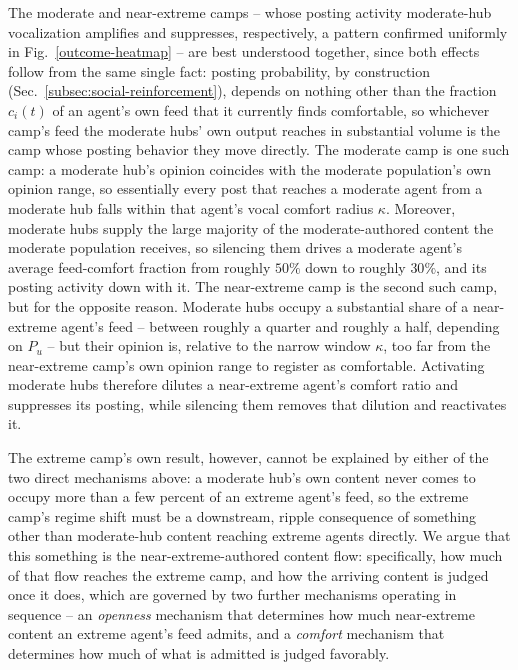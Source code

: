 \documentclass{svproc}
\def\VCR{\kappa}                 %
\begin{document}
The moderate and near-extreme camps -- whose posting activity
moderate-hub vocalization amplifies and suppresses, respectively, a
pattern confirmed uniformly in Fig.~\ref{outcome-heatmap} -- are
best understood together, since both effects follow from the same
single fact: posting probability, by construction
(Sec.~\ref{subsec:social-reinforcement}), depends on nothing other
than the fraction $c_i(t)$ of an agent's own feed that it currently
finds comfortable, so whichever camp's feed the moderate hubs' own
output reaches in substantial volume is the camp whose posting
behavior they move directly. The moderate camp is one such camp: a
moderate hub's opinion coincides with the moderate population's own
opinion range, so essentially every post that reaches a moderate
agent from a moderate hub falls within that agent's vocal comfort
radius $\VCR$. Moreover, moderate hubs supply the large majority of
the moderate-authored content the moderate population receives, so
silencing them drives a moderate agent's average feed-comfort
fraction from roughly $50\%$ down to roughly $30\%$, and its
posting activity down with it. The near-extreme camp is the second
such camp, but for the opposite reason. Moderate hubs occupy a
substantial share of a near-extreme agent's feed -- between roughly
a quarter and roughly a half, depending on $P_u$ -- but their
opinion is, relative to the narrow window $\VCR$, too far from the
near-extreme camp's own opinion range to register as comfortable.
Activating moderate hubs therefore dilutes a near-extreme agent's
comfort ratio and suppresses its posting, while silencing them
removes that dilution and reactivates it.

The extreme camp's own result, however, cannot be explained by
either of the two direct mechanisms above: a moderate hub's own
content never comes to occupy more than a few percent of an extreme
agent's feed, so the extreme camp's regime shift must be a
downstream, ripple consequence of something other than
moderate-hub content reaching extreme agents directly. We argue
that this something is the near-extreme-authored content flow:
specifically, how much of that flow reaches the extreme camp, and
how the arriving content is judged once it does, which are governed
by two further mechanisms operating in sequence -- an
\emph{openness} mechanism that determines how much near-extreme
content an extreme agent's feed admits, and a \emph{comfort}
mechanism that determines how much of what is admitted is judged
favorably.
\end{document}
